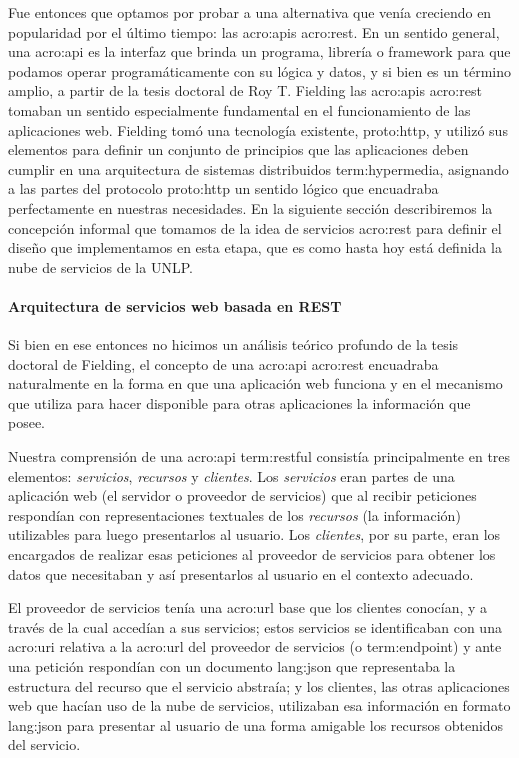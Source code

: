 Fue entonces que optamos por probar a una alternativa que venía creciendo en popularidad por el último tiempo: las \glspl{acro:api} \gls{acro:rest}. En un sentido general, una \gls{acro:api} es la interfaz que brinda un programa, librería o framework para que podamos operar programáticamente con su lógica y datos, y si bien es un término amplio, a partir de la tesis doctoral de Roy T. Fielding \cite[``Architectural Styles and the Design of Network-based Software Architectures'']{tesis:fielding} las \glspl{acro:api} \gls{acro:rest} tomaban un sentido especialmente fundamental en el funcionamiento de las aplicaciones web. Fielding tomó una tecnología existente, \gls{proto:http}, y utilizó sus elementos para definir un conjunto de principios que las aplicaciones deben cumplir en una arquitectura de sistemas distribuidos \gls{term:hypermedia}, asignando a las partes del protocolo \gls{proto:http} un sentido lógico que encuadraba perfectamente en nuestras necesidades. En la siguiente sección describiremos la concepción informal que tomamos de la idea de servicios \gls{acro:rest} para definir el diseño que implementamos en esta etapa, que es como hasta hoy está definida la nube de servicios de la UNLP.


\paragraph{Arquitectura de servicios web basada en REST}

Si bien en ese entonces no hicimos un análisis teórico profundo de la tesis doctoral de Fielding, el concepto de una \gls{acro:api} \gls{acro:rest} encuadraba naturalmente en la forma en que una aplicación web funciona y en el mecanismo que utiliza para hacer disponible para otras aplicaciones la información que posee.

Nuestra comprensión de una \gls{acro:api} \gls{term:restful} consistía principalmente en tres elementos: \textit{servicios}, \textit{recursos} y \textit{clientes}. Los \textit{servicios} eran partes de una aplicación web (el servidor o proveedor de servicios) que al recibir peticiones respondían con representaciones textuales de los \textit{recursos} (la información) utilizables para luego presentarlos al usuario. Los \textit{clientes}, por su parte, eran los encargados de realizar esas peticiones al proveedor de servicios para obtener los datos que necesitaban y así presentarlos al usuario en el contexto adecuado.

El proveedor de servicios tenía una \gls{acro:url} base que los clientes conocían, y a través de la cual accedían a sus servicios; estos servicios se identificaban con una \gls{acro:uri} relativa a la \gls{acro:url} del proveedor de servicios (o \gls{term:endpoint}) y ante una petición respondían con un documento \gls{lang:json} que representaba la estructura del recurso que el servicio abstraía; y los clientes, las otras aplicaciones web que hacían uso de la nube de servicios, utilizaban esa información en formato \gls{lang:json} para presentar al usuario de una forma amigable los recursos obtenidos del servicio.

